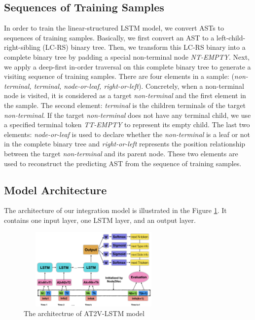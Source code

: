 \documentclass[E]{compsoft}
\begin{document}
\subsection{Sequences of Training Samples}
In order to train the linear-structured LSTM model, we convert ASTs to sequences of training samples.
Basically, we first convert an AST to a left-child-right-sibling (LC-RS) binary tree. 
Then, we transform this LC-RS binary into a complete binary tree by padding a special non-terminal node \textit{NT-EMPTY}.
Next, we apply a deep-first in-order traversal on this complete binary tree to generate a visiting sequence of training samples. 
There are four elements in a sample: (\textit{non-terminal, terminal, node-or-leaf, right-or-left}).
Concretely, when a non-terminal node is visited, it is considered as a target \textit{non-terminal} and the first element in the sample.
The second element: \textit{terminal} is the children terminals of the target \textit{non-terminal}.
If the target \textit{non-terminal} does not have any terminal child, we use a specified terminal token \textit{TT-EMPTY} to represent its empty child.
The last two elements: \textit{node-or-leaf} is used to declare whether the \textit{non-terminal} is a leaf or not in the complete binary tree and \textit{right-or-left} represents the position relationship between the target \textit{non-terminal} and its parent node. 
These two elements are used to reconstruct the predicting AST from the sequence of training samples.



\subsection{Model Architecture}
The architecture of our integration model is illustrated in the Figure \ref{fig:nti2p_model_architecture}. 
It contains one input layer, one LSTM layer, and an output layer. 


\begin{figure}[!ht]
\centering
\includegraphics[height=4cm, width=7.5cm]{pictures/lstm_structure.png}
\caption{The architectrue of AT2V-LSTM model}
\label{fig:nti2p_model_architecture}
\end{figure}
\end{document}
